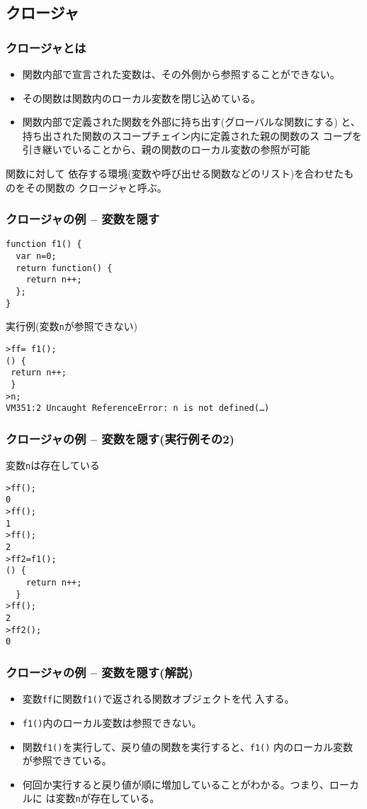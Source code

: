 \subsection{クロージャ}
\begin{frame}[containsverbatim]
\frametitle{クロージャとは}
\begin{itemize}
 \item 関数内部で宣言された変数は、その外側から参照することができない。
 \item その関数は関数内のローカル変数を閉じ込めている。
 \item 関数内部で定義された関数を外部に持ち出す(グローバルな関数にする)
       と、持ち出された関数のスコープチェイン内に定義された親の関数のス
       コープを引き継いでいることから、親の関数のローカル変数の参照が可能
\end{itemize}
関数に対して
依存する環境(変数や呼び出せる関数などのリスト)を合わせたものをその関数の
クロージャと呼ぶ。
\end{frame}
\begin{frame}[containsverbatim]
\frametitle{クロージャの例 -- 変数を隠す}
\begin{Verbatim}
function f1() {
  var n=0;
  return function() {
    return n++;
  };
}
\end{Verbatim}
 実行例(変数\Verb+n+が参照できない)
\begin{Verbatim}
>ff= f1();
() {
 return n++;
 }
>n;
VM351:2 Uncaught ReferenceError: n is not defined(…)
\end{Verbatim}
\end{frame}
\begin{frame}[containsverbatim]
\frametitle{クロージャの例 -- 変数を隠す(実行例その2)}
 変数\Verb+n+は存在している
\begin{Verbatim}
>ff();
0
>ff();
1
>ff();
2
>ff2=f1();
() {
    return n++;
  }
>ff();
2
>ff2();
0
\end{Verbatim}
 \end{frame}
\begin{frame}[containsverbatim]
\frametitle{クロージャの例 -- 変数を隠す(解説)}
\begin{itemize}
 \item 変数\texttt{ff}に関数\texttt{f1()}で返される関数オブジェクトを代
       入する。
 \item \texttt{f1()}内のローカル変数は参照できない。
 \item 関数\Verb+f1()+を実行して、戻り値の関数を実行すると、\Verb+f1()+
       内のローカル変数が参照できている。
 \item 何回か実行すると戻り値が順に増加していることがわかる。つまり、ローカルに
は変数\texttt{n}が存在している。
\end{itemize}
\end{frame}
